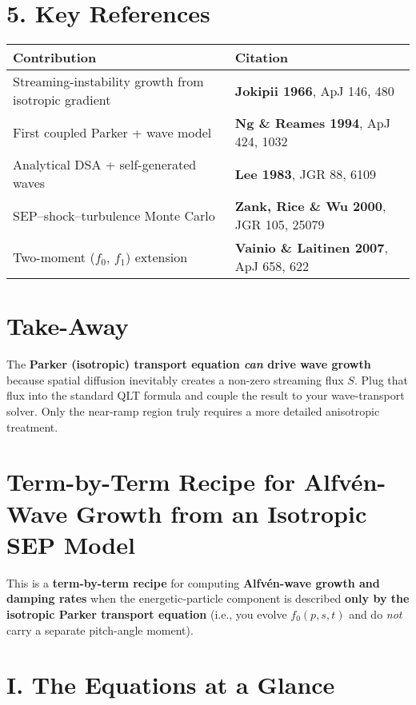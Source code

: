 \section*{5. Key References}

\begin{center}
\begin{tabular}{p{9cm} l}
\toprule
\textbf{Contribution} & \textbf{Citation} \\
\midrule
Streaming-instability growth from isotropic gradient & \textbf{Jokipii 1966}, ApJ 146, 480 \\
First coupled Parker + wave model & \textbf{Ng \& Reames 1994}, ApJ 424, 1032 \\
Analytical DSA + self-generated waves & \textbf{Lee 1983}, JGR 88, 6109 \\
SEP--shock--turbulence Monte Carlo & \textbf{Zank, Rice \& Wu 2000}, JGR 105, 25079 \\
Two-moment ($f_0$, $f_1$) extension & \textbf{Vainio \& Laitinen 2007}, ApJ 658, 622 \\
\bottomrule
\end{tabular}
\end{center}

\section*{Take-Away}

The \textbf{Parker (isotropic) transport equation \textit{can} drive wave growth} because spatial diffusion inevitably creates a non-zero streaming flux $S$. Plug that flux into the standard QLT formula and couple the result to your wave-transport solver. Only the near-ramp region truly requires a more detailed anisotropic treatment.

\section*{Term-by-Term Recipe for Alfvén-Wave Growth from an Isotropic SEP Model}

This is a \textbf{term-by-term recipe} for computing \textbf{Alfvén-wave growth and damping rates} when the energetic-particle component is described \textbf{only by the isotropic Parker transport equation} (i.e., you evolve $f_0(p,s,t)$ and do \textit{not} carry a separate pitch-angle moment).

\section*{I. The Equations at a Glance}

